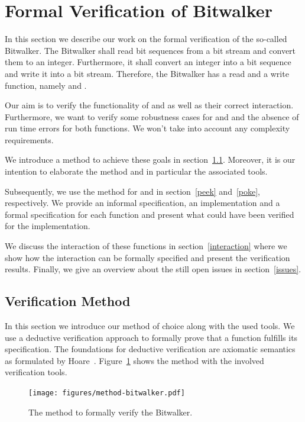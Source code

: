 
\section{Formal Verification of Bitwalker}
\label{sec:fokus}


In this section we describe our work on the formal verification
of the so-called Bitwalker.
The Bitwalker shall read bit sequences from a bit stream 
and convert them to an integer. Furthermore, it shall
convert an integer into a bit sequence and write it into a bit stream.
Therefore, the Bitwalker has a read and a write function, namely \peek and \poke.

Our aim is to verify the functionality of
\peek and \poke
as well as their correct interaction.
Furthermore, we want to verify some robustness cases for \peek and \poke
and the absence of run time errors for both functions.
We won't take into account any complexity requirements.

We introduce a method to achieve these goals in section~\ref{plan}.
Moreover, it is our intention
to elaborate the method and in particular the associated tools.

Subsequently, we use the method for \peek and \poke
in section~\ref{peek} and~\ref{poke}, respectively.
We provide an informal specification, an implementation and
a formal specification for each function and
present what could have been verified for the implementation.

We discuss the interaction of these functions in section~\ref{interaction}
where we show how the interaction can be formally specified 
and present the verification results.
Finally, we give an overview about the still open issues in section~\ref{issues}.


\subsection{Verification Method}
\label{plan}
\label{method}

In this section we introduce our method of choice along with the used tools.
We use a deductive verification approach to 
formally prove that a function fulfills its specification.
The foundations for deductive verification are axiomatic semantics as formulated
by Hoare~\cite{HoareCalculus}.
Figure~\ref{fig:method} shows the method with the involved verification tools.

\begin{figure}[hbt]
\centering
\texttt{[image: figures/method-bitwalker.pdf]}
\caption{\label{fig:method} The method to formally verify the Bitwalker.}
\end{figure}

